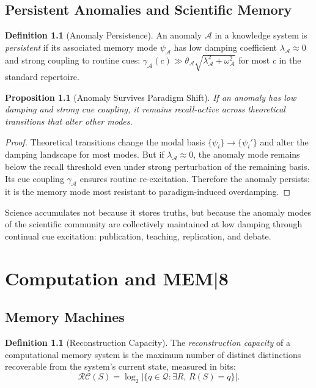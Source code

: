 \documentclass[12pt, oneside]{book}
\theoremstyle{plain}
\newtheorem{proposition}[theorem]{Proposition}
\theoremstyle{definition}
\newtheorem{definition}[theorem]{Definition}
\theoremstyle{remark}
\newcommand{\calQ}{\mathcal{Q}}
\begin{document}
\chapter{Persistent Anomalies and Scientific Memory}

\begin{definition}[Anomaly Persistence]
An anomaly $\mathcal{A}$ in a knowledge system is
\emph{persistent} if its associated memory mode $\psi_{\mathcal{A}}$
has low damping coefficient $\lambda_{\mathcal{A}} \approx 0$
and strong coupling to routine cues:
$\gamma_{\mathcal{A}}(c) \gg \theta_{\mathcal{A}} \sqrt{\lambda_{\mathcal{A}}^2 + \omega_{\mathcal{A}}^2}$
for most $c$ in the standard repertoire.
\end{definition}

\begin{proposition}[Anomaly Survives Paradigm Shift]
If an anomaly has low damping and strong cue coupling,
it remains recall-active across theoretical transitions
that alter other modes.
\end{proposition}

\begin{proof}
Theoretical transitions change the modal basis
$\{\psi_i\} \to \{\psi_i'\}$ and alter the damping
landscape for most modes.
But if $\lambda_{\mathcal{A}} \approx 0$, the anomaly mode
remains below the recall threshold even under strong
perturbation of the remaining basis.
Its cue coupling $\gamma_{\mathcal{A}}$ ensures routine
re-excitation.
Therefore the anomaly persists: it is the memory
mode most resistant to paradigm-induced overdamping.
\end{proof}

Science accumulates not because it stores truths,
but because the anomaly modes of the scientific community
are collectively maintained at low damping through
continual cue excitation: publication, teaching,
replication, and debate.

\part{Computation and MEM|8}

\chapter{Memory Machines}

\begin{definition}[Reconstruction Capacity]
The \emph{reconstruction capacity} of a computational
memory system is the maximum number of
distinct distinctions recoverable from the system's
current state, measured in bits:
\[
  \mathcal{RC}(S) = \log_2 |\{q \in \calQ : \exists R,\, R(S) = q\}|.
\]
\end{definition}
\end{document}
